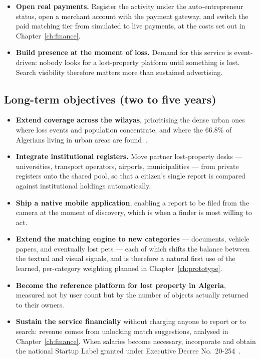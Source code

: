 \begin{itemize}[leftmargin=1.4em,itemsep=4pt]
  \item \textbf{Open real payments.} Register the activity under the
        auto-entrepreneur status, open a merchant account with the payment
        gateway, and switch the paid matching tier from simulated to live
        payments, at the costs set out in Chapter~\ref{ch:finance}.

  \item \textbf{Build presence at the moment of loss.} Demand for this service
        is event-driven: nobody looks for a lost-property platform until
        something is lost. Search visibility therefore matters more than
        sustained advertising.
\end{itemize}

\subsection{Long-term objectives (two to five years)}

\begin{itemize}[leftmargin=1.4em,itemsep=4pt]
  \item \textbf{Extend coverage across the wilayas}, prioritising the dense
        urban ones where loss events and population concentrate, and where the
        66.8\% of Algerians living in urban areas are
        found~\cite{macrotrends2025}.

  \item \textbf{Integrate institutional registers.} Move partner lost-property
        desks --- universities, transport operators, airports, municipalities
        --- from private registers onto the shared pool, so that a citizen's
        single report is compared against institutional holdings automatically.

  \item \textbf{Ship a native mobile application}, enabling a report to be filed
        from the camera at the moment of discovery, which is when a finder is
        most willing to act.

  \item \textbf{Extend the matching engine to new categories} --- documents,
        vehicle papers, and eventually lost pets --- each of which shifts the
        balance between the textual and visual signals, and is therefore a
        natural first use of the learned, per-category weighting planned in
        Chapter~\ref{ch:prototype}.

  \item \textbf{Become the reference platform for lost property in Algeria},
        measured not by user count but by the number of objects actually
        returned to their owners.

  \item \textbf{Sustain the service financially} without charging anyone to
        report or to search: revenue comes from unlocking match suggestions,
        analysed in Chapter~\ref{ch:finance}. When salaries become necessary,
        incorporate and obtain the national Startup Label granted under
        Executive Decree No.~20-254~\cite{startupdz}.
\end{itemize}

